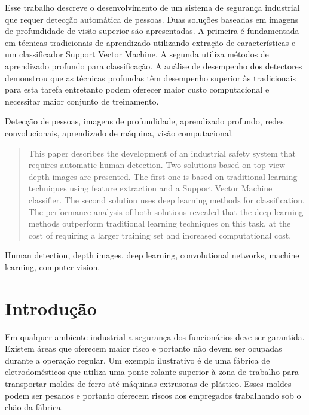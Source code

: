 \begin{resumo}
Esse trabalho descreve o desenvolvimento de um sistema de segurança industrial que requer detecção automática de pessoas. Duas soluções baseadas em imagens de profundidade de visão superior são apresentadas. A primeira é fundamentada em técnicas tradicionais de aprendizado utilizando extração de características e um classificador Support Vector Machine. A segunda utiliza métodos de aprendizado profundo para classificação. A análise de desempenho dos detectores demonstrou que as técnicas profundas têm desempenho superior às tradicionais para esta tarefa entretanto podem oferecer maior custo computacional e necessitar maior conjunto de treinamento.
\end{resumo}

\begin{chave}
Detecção de pessoas, imagens de profundidade, aprendizado profundo, redes convolucionais, aprendizado de máquina, visão computacional.
\end{chave}

\begin{abstract}
This paper describes the development of an industrial safety system that requires automatic human detection. Two solutions based on top-view depth images are presented. The first one is based on traditional learning techniques using feature extraction and a Support Vector Machine classifier. The second solution uses deep learning methods for classification. The performance analysis of both solutions revealed that the deep learning methods outperform traditional learning techniques on this task, at the cost of requiring a larger training set and increased computational cost.
\end{abstract}

\begin{keywords}
  Human detection, depth images, deep learning, convolutional networks, machine learning, computer vision.
\end{keywords}

\section{Introdução}
  Em qualquer ambiente industrial a segurança dos funcionários deve ser garantida. Existem áreas que oferecem maior risco e portanto não devem ser ocupadas durante a operação regular. Um exemplo ilustrativo é de uma fábrica de eletrodomésticos que utiliza uma ponte rolante superior à zona de trabalho para transportar moldes de ferro até máquinas extrusoras de plástico. Esses moldes podem ser pesados e portanto oferecem riscos aos empregados trabalhando sob o chão da fábrica.

